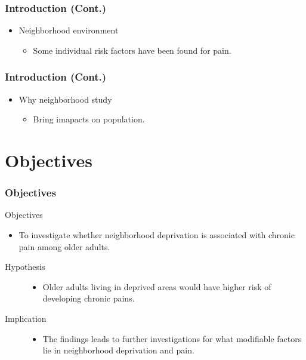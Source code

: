 \documentclass[dvipdfmx]{beamer}\usepackage[]{graphicx}\usepackage[]{color}
\begin{document}
\begin{frame}
	\frametitle{Introduction (Cont.)}
	\begin{itemize}
		\item Neighborhood environment
			\begin{itemize}
				\item Some individual risk factors have been found for pain.
			\end{itemize}
	\end{itemize}
\end{frame}


\begin{frame}
	\frametitle{Introduction (Cont.)}
	\begin{itemize}
		\item Why neighborhood study
			\begin{itemize}
				\item Bring imapacts on population.
			\end{itemize}
	\end{itemize}
\end{frame}

\section{Objectives}
\begin{frame}
	\frametitle{Objectives}
	\begin{block}{Objectives}
		\begin{itemize}
			\item To investigate whether neighborhood deprivation is associated with chronic pain among older adults.
		\end{itemize}
	\end{block}
	\begin{description}
		\item[Hypothesis] \mbox{}\par
			\begin{itemize} 
				\item Older adults living in deprived areas would have higher risk of developing chronic pains.
			\end{itemize} 
		\item[Implication] \mbox{}\par
			\begin{itemize} 
				\item The findings leads to further investigations for what modifiable factors lie in neighborhood deprivation and pain.
			\end{itemize} 
	\end{description}
\end{frame}
\end{document}
